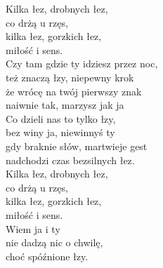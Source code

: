 \begin{text}
    Kilka łez, drobnych łez,\\
    co drżą u rzęs,\\
    kilka łez, gorzkich łez,\\
    miłość i sens.\\
    Czy tam gdzie ty idziesz przez noc,\\
    też znaczą łzy, niepewny krok\\
    że wrócę na twój pierwszy znak\\
    naiwnie tak, marzysz jak ja\\
    Co dzieli nas to tylko łzy,\\
    bez winy ja, niewinnyś ty\\
    gdy braknie słów, martwieje gest\\
    nadchodzi czas bezsilnych łez.\\
    Kilka łez, drobnych łez,\\
    co drżą u rzęs,\\
    kilka łez, gorzkich łez,\\
    miłość i sens.\\
    Wiem ja i ty\\
    nie dadzą nic o chwilę,\\
    choć spóźnione łzy.
\end{text}
\begin{chord}

\end{chord}